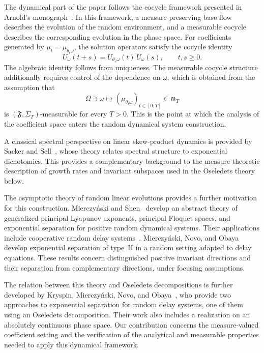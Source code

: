 \documentclass[reqno]{amsart}
\theoremstyle{plain}
\numberwithin{equation}{section}
\numberwithin{definition}{section}
\begin{document}
The dynamical part of the paper follows the cocycle
framework presented in Arnold's
monograph~\cite{Arnold1998}. In this framework,
a measure-preserving base flow describes the evolution
of the random environment, and a measurable cocycle
describes the corresponding evolution in the phase space.
For coefficients generated by $\mu_t=\mu_{\theta_t\omega}$, 
the solution operators satisfy the cocycle identity
\begin{equation*}
    U_\omega(t+s)
    =
    U_{\theta_s\omega}(t)\,U_\omega(s),
    \qquad t,s\geq0.
\end{equation*}
The algebraic identity follows from uniqueness.
The measurable cocycle structure additionally requires
control of the dependence on $\omega$, which is obtained
from the assumption that
\begin{equation*}
    \Omega\ni\omega
    \mapsto 
    (\mu_{\theta_t\omega})_{t\in[0,T]}
    \in\mathfrak m_T
\end{equation*}
is $(\mathfrak{F},\Sigma_T)$-measurable for every $T>0$.
This is the point at which the analysis of the coefficient
space enters the random dynamical system construction.

A classical spectral perspective on linear skew-product
dynamics is provided by Sacker and
Sell~\cite{SackerSell1978}, whose theory relates
spectral structure to exponential dichotomies.
This provides a complementary background to the
measure-theoretic description of growth rates and
invariant subspaces used in the Oseledets theory below.

The asymptotic theory of random linear evolutions provides
a further motivation for this construction.
Mierczy\'nski and Shen~\cite{MierczynskiShen2013}
develop an abstract theory of generalized principal
Lyapunov exponents, principal Floquet spaces, and
exponential separation for positive random dynamical
systems. Their applications include cooperative random
delay systems~\cite{MierczynskiShen2016}.
Mierczy\'nski, Novo, and
Obaya~\cite{MierczynskiNovoObaya2018}
develop exponential separation of type~II in a random
setting adapted to delay equations.
These results concern distinguished positive invariant
directions and their separation from complementary
directions, under focusing
assumptions.

The relation between this theory and Oseledets
decompositions is further developed by Kryspin,
Mierczy\'nski, Novo, and
Obaya~\cite{Marek-Janusz-Sylvia-Rafa},
who provide two approaches to exponential separation
for random delay systems, one of them using an
Oseledets decomposition. Their work also includes
a realization on an absolutely continuous phase space. Our contribution concerns the
measure-valued coefficient setting and the verification
of the analytical and measurable properties needed
to apply this dynamical framework.
\end{document}
